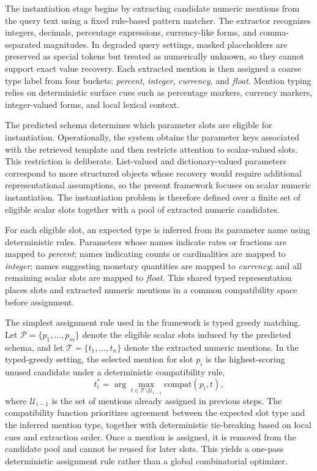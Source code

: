 \documentclass[pdflatex,sn-basic,Numbered]{sn-jnl}
\begin{document}
The instantiation stage begins by extracting candidate numeric mentions from the query text using a fixed rule-based pattern matcher. The extractor recognizes integers, decimals, percentage expressions, currency-like forms, and comma-separated magnitudes. In degraded query settings, masked placeholders are preserved as special tokens but treated as numerically unknown, so they cannot support exact value recovery. Each extracted mention is then assigned a coarse type label from four buckets: \emph{percent}, \emph{integer}, \emph{currency}, and \emph{float}. Mention typing relies on deterministic surface cues such as percentage markers, currency markers, integer-valued forms, and local lexical context.

The predicted schema determines which parameter slots are eligible for instantiation. Operationally, the system obtains the parameter keys associated with the retrieved template and then restricts attention to scalar-valued slots. This restriction is deliberate. List-valued and dictionary-valued parameters correspond to more structured objects whose recovery would require additional representational assumptions, so the present framework focuses on scalar numeric instantiation. The instantiation problem is therefore defined over a finite set of eligible scalar slots together with a pool of extracted numeric candidates.

For each eligible slot, an expected type is inferred from its parameter name using deterministic rules. Parameters whose names indicate rates or fractions are mapped to \emph{percent}; names indicating counts or cardinalities are mapped to \emph{integer}; names suggesting monetary quantities are mapped to \emph{currency}; and all remaining scalar slots are mapped to \emph{float}. This shared typed representation places slots and extracted numeric mentions in a common compatibility space before assignment.

The simplest assignment rule used in the framework is typed greedy matching. Let $\mathcal{P}=\{p_1,\dots,p_m\}$ denote the eligible scalar slots induced by the predicted schema, and let $\mathcal{T}=\{t_1,\dots,t_n\}$ denote the extracted numeric mentions. In the typed-greedy setting, the selected mention for slot $p_i$ is the highest-scoring unused candidate under a deterministic compatibility rule,
\begin{equation}
t_i^{*} = \arg\max_{t \in \mathcal{T}\setminus \mathcal{U}_{i-1}} \mathrm{compat}(p_i,t),
\label{eq:typed_assignment}
\end{equation}
where $\mathcal{U}_{i-1}$ is the set of mentions already assigned in previous steps. The compatibility function prioritizes agreement between the expected slot type and the inferred mention type, together with deterministic tie-breaking based on local cues and extraction order. Once a mention is assigned, it is removed from the candidate pool and cannot be reused for later slots. This yields a one-pass deterministic assignment rule rather than a global combinatorial optimizer.
\end{document}

